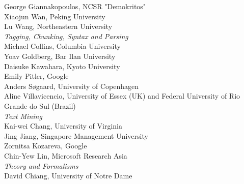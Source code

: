                                     \hspace*{0.2in} George Giannakopoulos, NCSR "Demokritos" \\
                                    \hspace*{0.2in} Xiaojun Wan, Peking University \\
                                    \hspace*{0.2in} Lu Wang, Northeastern University \\
                            \emph{Tagging, Chunking, Syntax and Parsing} \\
                                    \hspace*{0.2in} Michael Collins, Columbia University \\
                                    \hspace*{0.2in} Yoav Goldberg, Bar Ilan University \\
                                    \hspace*{0.2in} Daisuke Kawahara, Kyoto University \\
                                    \hspace*{0.2in} Emily Pitler, Google \\
                                    \hspace*{0.2in} Anders Søgaard, University of Copenhagen \\
                                    \hspace*{0.2in} Aline Villavicencio, University of Essex (UK) and Federal University of Rio Grande do Sul (Brazil) \\
                            \emph{Text Mining} \\
                                    \hspace*{0.2in} Kai-wei Chang, University of Virginia \\
                                    \hspace*{0.2in} Jing Jiang, Singapore Management University \\
                                    \hspace*{0.2in} Zornitsa Kozareva, Google \\
                                    \hspace*{0.2in} Chin-Yew Lin, Microsoft Research Asia \\
                            \emph{Theory and Formalisms} \\
                                    \hspace*{0.2in} David Chiang, University of Notre Dame \\
